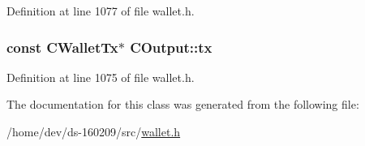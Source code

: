 Definition at line 1077 of file wallet.\+h.

\hypertarget{class_c_output_ad5c15e7a2dc48258127b8fd5db421ad5}{}
\subsubsection[{tx}]{\setlength{\rightskip}{0pt plus 5cm}const {\bf C\+Wallet\+Tx}$\ast$ C\+Output\+::tx}\label{class_c_output_ad5c15e7a2dc48258127b8fd5db421ad5}


Definition at line 1075 of file wallet.\+h.



The documentation for this class was generated from the following file\+:\begin{DoxyCompactItemize}
\item 
/home/dev/ds-\/160209/src/\hyperlink{wallet_8h}{wallet.\+h}\end{DoxyCompactItemize}
